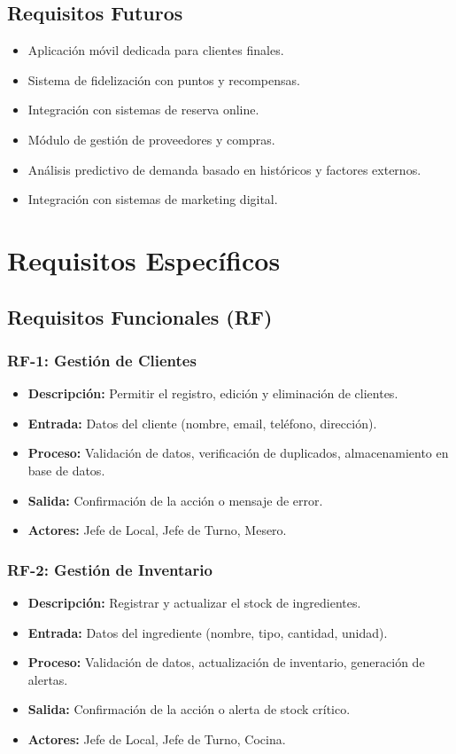 \documentclass[12pt]{article}
\begin{document}
\subsection{Requisitos Futuros}
\begin{itemize}
  \item Aplicación móvil dedicada para clientes finales.
  \item Sistema de fidelización con puntos y recompensas.
  \item Integración con sistemas de reserva online.
  \item Módulo de gestión de proveedores y compras.
  \item Análisis predictivo de demanda basado en históricos y factores externos.
  \item Integración con sistemas de marketing digital.
\end{itemize}

\section{Requisitos Específicos}
\subsection{Requisitos Funcionales (RF)}

\subsubsection{RF-1: Gestión de Clientes}
\begin{itemize}
  \item \textbf{Descripción:} Permitir el registro, edición y eliminación de clientes.
  \item \textbf{Entrada:} Datos del cliente (nombre, email, teléfono, dirección).
  \item \textbf{Proceso:} Validación de datos, verificación de duplicados, almacenamiento en base de datos.
  \item \textbf{Salida:} Confirmación de la acción o mensaje de error.
  \item \textbf{Actores:} Jefe de Local, Jefe de Turno, Mesero.
\end{itemize}

\subsubsection{RF-2: Gestión de Inventario}
\begin{itemize}
  \item \textbf{Descripción:} Registrar y actualizar el stock de ingredientes.
  \item \textbf{Entrada:} Datos del ingrediente (nombre, tipo, cantidad, unidad).
  \item \textbf{Proceso:} Validación de datos, actualización de inventario, generación de alertas.
  \item \textbf{Salida:} Confirmación de la acción o alerta de stock crítico.
  \item \textbf{Actores:} Jefe de Local, Jefe de Turno, Cocina.
\end{itemize}
\end{document}
